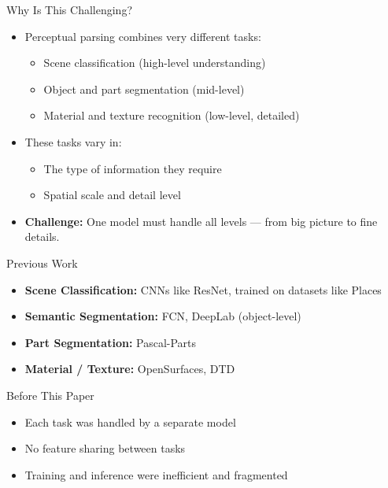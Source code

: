 \documentclass{beamer}
\begin{document}

\begin{frame}{Why Is This Challenging?}
  \begin{itemize}
    \item Perceptual parsing combines very different tasks:
    \begin{itemize}
      \item Scene classification (high-level understanding)
      \item Object and part segmentation (mid-level)
      \item Material and texture recognition (low-level, detailed)
    \end{itemize}

    \vspace{0.3cm}

    \item These tasks vary in:
    \begin{itemize}
      \item The type of information they require
      \item Spatial scale and detail level
    \end{itemize}

    \vspace{0.3cm}

    \item \textbf{Challenge:} One model must handle all levels — from big picture to fine details.
  \end{itemize}
\end{frame}


\begin{frame}{Previous Work}
  \begin{itemize}
    \item \textbf{Scene Classification:} CNNs like ResNet, trained on datasets like Places
    \item \textbf{Semantic Segmentation:} FCN, DeepLab (object-level)
    \item \textbf{Part Segmentation:} Pascal-Parts
    \item \textbf{Material / Texture:} OpenSurfaces, DTD
  \end{itemize}
  
  \vspace{0.4cm}
  
  \begin{block}{Before This Paper}
    \begin{itemize}
      \item Each task was handled by a separate model
      \item No feature sharing between tasks
      \item Training and inference were inefficient and fragmented
    \end{itemize}
  \end{block}
\end{frame}
\end{document}
